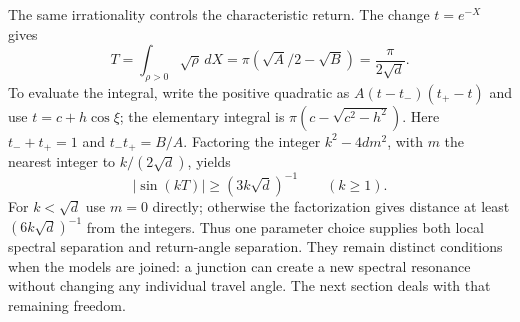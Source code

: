 The same irrationality controls the characteristic return.  The change
$t=e^{-X}$ gives
\begin{equation}\label{eq:rad-eq-rm2}
 T=\int_{\rho>0}\sqrt\rho\,dX
   =\pi(\sqrt A/2-\sqrt B)=\frac\pi{2\sqrt d}.
\end{equation}
To evaluate the integral, write the positive quadratic as
$A(t-t_-)(t_+-t)$ and use $t=c+h\cos\xi$; the elementary integral is
$\pi(c-\sqrt{c^2-h^2})$.  Here $t_-+t_+=1$ and
$t_-t_+=B/A$.  Factoring the integer $k^2-4dm^2$, with $m$ the nearest
integer to $k/(2\sqrt d)$, yields
\begin{equation}\label{eq:rad-eq-morse-small-divisor}
 |\sin(kT)|\ge(3k\sqrt d)^{-1}\qquad(k\ge1).
\end{equation}
For $k<\sqrt d$ use $m=0$ directly; otherwise the factorization gives
distance at least $(6k\sqrt d)^{-1}$ from the integers.
Thus one parameter choice supplies both local spectral separation and
return-angle separation.  They remain distinct conditions when the
models are joined: a junction can create a new spectral resonance
without changing any individual travel angle.  The next section deals
with that remaining freedom.

